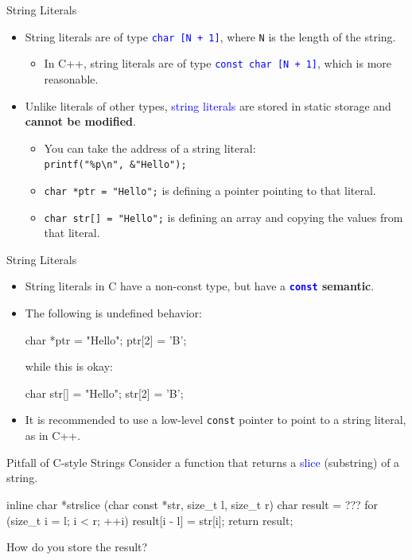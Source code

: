 \documentclass{beamer}
\newcommand{\blue}[1]{\textcolor{blue}{#1}}
\newcommand{\ttt}[1]{\texttt{#1}}
\newcommand{\bluett}[1]{\blue{\ttt{#1}}}
\theoremstyle{definition}
\begin{document}
\begin{frame}{String Literals}
    \begin{itemize}
        \item String literals are of type \bluett{char [N + 1]}, where \ttt{N} is the length of the string.
        \begin{itemize}
            \item In C++, string literals are of type \bluett{const char [N + 1]}, which is more reasonable.
        \end{itemize}
        \pause
        \item Unlike literals of other types, \blue{string literals} are stored in static storage and \textbf{cannot be modified}.
        \begin{itemize}
            \item You can take the address of a string literal:\\
            \ttt{printf("\%p\textbackslash n", \&"Hello");}
            \pause
            \item \ttt{char *ptr = "Hello";} is defining a pointer pointing to that literal.
            \item \ttt{char str[] = "Hello";} is defining an array and copying the values from that literal.
        \end{itemize}
    \end{itemize}
\end{frame}

\begin{frame}[fragile]{String Literals}
    \begin{itemize}
        \item String literals in C have a non-const type, but have a \textbf{\bluett{const} semantic}.
        \item The following is undefined behavior:
        \begin{cpp}
char *ptr = "Hello";
ptr[2] = 'B';
        \end{cpp}
        while this is okay:
        \begin{cpp}
char str[] = "Hello";
str[2] = 'B';
        \end{cpp}
        \pause
        \item It is recommended to use a low-level \ttt{const} pointer to point to a string literal, as in C++.
    \end{itemize}
\end{frame}

\begin{frame}[fragile]{Pitfall of C-style Strings}
    Consider a function that returns a \blue{slice} (substring) of a string.
    \begin{cpp}
inline char *strslice
    (char const *str, size_t l, size_t r) {
  char result = ???
  for (size_t i = l; i < r; ++i)
    result[i - l] = str[i];
  return result;
}
    \end{cpp}
    How do you store the result?
\end{frame}
\end{document}
